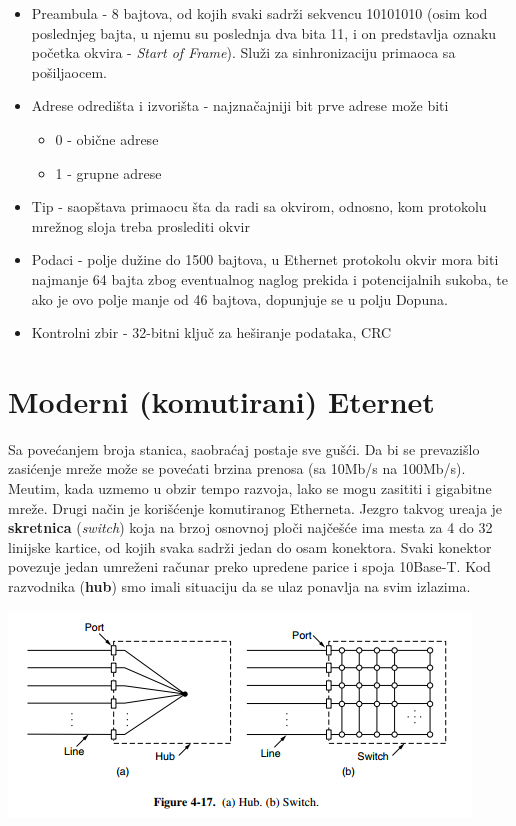 \documentclass{article} %
\begin{document}
\begin{itemize}
	\item Preambula - 8 bajtova, od kojih svaki sadr\v{z}i sekvencu 10101010 (osim kod poslednjeg bajta, u njemu su poslednja dva bita 11, i on predstavlja oznaku po\v{c}etka okvira - \textit{Start of Frame}). Slu\v{z}i za sinhronizaciju primaoca sa po\v{s}iljaocem.
	\item Adrese odredi\v{s}ta i izvori\v{s}ta - najzna\v{c}ajniji bit prve adrese mo\v{z}e biti
	\begin{itemize}
		\item 0 - obi\v{c}ne adrese
		\item 1 - grupne adrese
	\end{itemize}
	\item Tip - saop\v{s}tava primaocu \v{s}ta da radi sa okvirom, odnosno, kom protokolu mre\v{z}nog sloja treba proslediti okvir
	\item Podaci - polje du\v{z}ine do 1500 bajtova, u Ethernet protokolu okvir mora biti najmanje 64 bajta zbog eventualnog naglog prekida i potencijalnih sukoba, te ako je ovo polje manje od 46 bajtova, dopunjuje se u polju Dopuna.
	\item Kontrolni zbir - 32-bitni klju\v{c} za he\v{s}iranje podataka, CRC
\end{itemize}

\section{Moderni (komutirani) Eternet}

Sa pove\'{c}anjem broja stanica, saobra\'{c}aj postaje sve gu\v{s}\'{c}i. Da bi se prevazi\v{s}lo zasi\'{c}enje mre\v{z}e mo\v{z}e se pove\'{c}ati brzina prenosa (sa 10Mb/s na 100Mb/s). Me\dj{}utim, kada uzmemo u obzir tempo razvoja, lako se mogu zasititi i gigabitne mre\v{z}e. Drugi na\v{c}in je kori\v{s}\'{c}enje komutiranog Etherneta. Jezgro takvog ure\dj{}aja je \textbf{skretnica} (\textit{switch}) koja na brzoj osnovnoj plo\v{c}i naj\v{c}e\v{s}\'{c}e ima mesta za 4 do 32 linijske kartice, od kojih svaka sadr\v{z}i jedan do osam konektora. Svaki konektor povezuje jedan umre\v{z}eni ra\v{c}unar preko upredene parice i spoja 10Base-T. Kod razvodnika (\textbf{hub}) smo imali situaciju da se ulaz ponavlja na svim izlazima.

\begin{center}
\includegraphics[scale=0.5]{hub-switch}
\end{center}
\end{document}
